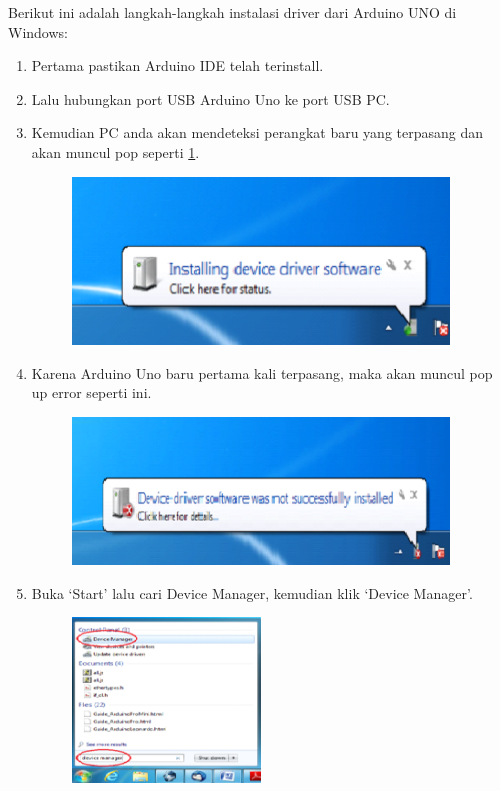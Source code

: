 Berikut ini adalah langkah-langkah instalasi driver dari Arduino UNO di Windows:
\begin{enumerate}
	\item Pertama pastikan Arduino IDE telah terinstall.
	\item Lalu hubungkan port USB Arduino Uno ke port USB PC.
	\item Kemudian PC anda akan mendeteksi perangkat baru yang terpasang dan akan muncul pop seperti \ref{1}.
	\begin{figure}[H]
		\includegraphics[width=10cm]{figures/5/1154121/Teori/1.png}
		\centering
        \label{1}
	\end{figure}
\item Karena Arduino Uno baru pertama kali terpasang, maka akan muncul pop up error seperti ini.
	\begin{figure}[H]
		\includegraphics[width=10cm]{figures/5/1154121/Teori/2.png}
		\centering
	\end{figure}
\item Buka `Start' lalu cari Device Manager, kemudian klik `Device Manager'.
	\begin{figure}[H]
		\includegraphics[width=5cm]{figures/5/1154121/Teori/3.png}
		\centering
	\end{figure}

\end{enumerate}
